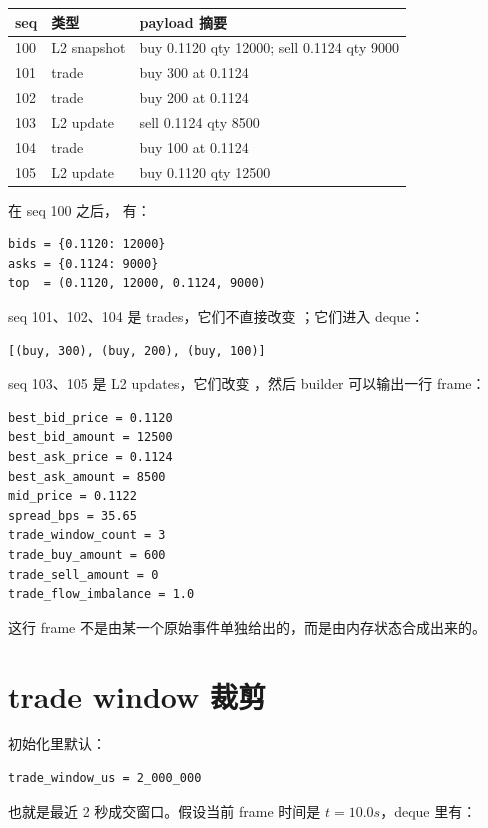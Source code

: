 \begin{longtable}{p{}p{}p{}}
\toprule
seq & 类型 & payload 摘要 \\
\midrule
100 & L2 snapshot & buy 0.1120 qty 12000; sell 0.1124 qty 9000 \\
101 & trade & buy 300 at 0.1124 \\
102 & trade & buy 200 at 0.1124 \\
103 & L2 update & sell 0.1124 qty 8500 \\
104 & trade & buy 100 at 0.1124 \\
105 & L2 update & buy 0.1120 qty 12500 \\
\bottomrule
\end{longtable}

在 seq 100 之后， 有：

\begin{lstlisting}
bids = {0.1120: 12000}
asks = {0.1124: 9000}
top  = (0.1120, 12000, 0.1124, 9000)
\end{lstlisting}

seq 101、102、104 是 trades，它们不直接改变 ；它们进入  deque：

\begin{lstlisting}
[(buy, 300), (buy, 200), (buy, 100)]
\end{lstlisting}

seq 103、105 是 L2 updates，它们改变 ，然后 builder 可以输出一行 frame：

\begin{lstlisting}
best_bid_price = 0.1120
best_bid_amount = 12500
best_ask_price = 0.1124
best_ask_amount = 8500
mid_price = 0.1122
spread_bps = 35.65
trade_window_count = 3
trade_buy_amount = 600
trade_sell_amount = 0
trade_flow_imbalance = 1.0
\end{lstlisting}

这行 frame 不是由某一个原始事件单独给出的，而是由内存状态合成出来的。

\section{trade window 裁剪}

 初始化里默认：

\begin{lstlisting}
trade_window_us = 2_000_000
\end{lstlisting}

也就是最近 2 秒成交窗口。假设当前 frame 时间是 \(t=10.0s\)，deque 里有：

